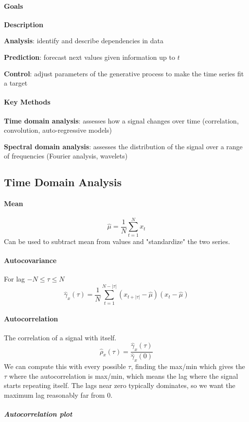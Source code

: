 \documentclass[10pt]{report}
\begin{document}
\paragraph{Goals}\begin{list}{}{}
	\item \textbf{Description}
	\item \textbf{Analysis}: identify and describe dependencies in data
	\item \textbf{Prediction}: forecast next values given information up to $t$
	\item \textbf{Control}: adjust parameters of the generative process to make the time series fit a target
\end{list}
\paragraph{Key Methods}\begin{list}{}{}
	\item \textbf{Time domain analysis}: assesses how a signal changes over time (correlation, convolution, auto-regressive models)
	\item \textbf{Spectral domain analysis}: assesses the distribution of the signal over a range of frequencies (Fourier analysis, wavelets)
\end{list}
\subsection{Time Domain Analysis}
\paragraph{Mean} $$\hat\mu=\frac{1}{N}\sum_{t=1}^N x_t$$
Can be used to subtract mean from values and "standardize" the two series.
\paragraph{Autocovariance} For lag $-N\leq \tau \leq N$
$$\hat\gamma_x(\tau) = \frac{1}{N}\sum_{t=1}^{N-|\tau|} (x_{t+|\tau|}-\hat\mu)(x_t - \hat\mu)$$
\paragraph{Autocorrelation} The correlation of a signal with itself. $$\hat\rho_x(\tau)=\frac{\hat\gamma_x(\tau)}{\hat\gamma_x(0)}$$
We can compute this with every possible $\tau$, finding the max/min which gives the $\tau$ where the autocorrelation is max/min, which means the lag where the signal starts repeating itself. The lags near zero typically dominates, so we want the maximum lag reasonably far from 0.
\subparagraph{Autocorrelation plot} %
\end{document}

